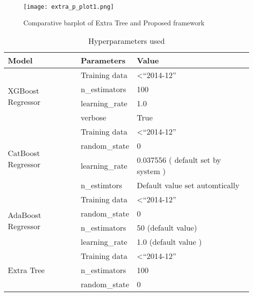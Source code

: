 \begin{figure*}[!h]
 \centering
 \texttt{[image: extra\_p\_plot1.png]}
 \label{}
 \caption{Comparative barplot of Extra Tree and Proposed framework }
\end{figure*}



\begin{table*}[]
\centering
\setlength{\tabcolsep}{3pt}
 {\renewcommand{\arraystretch}{1}%
\caption{Hyperparameters used}
\label{tab:my-table}
\begin{tabular}[c]{|p{}|p{}|p{}|}
\hline   \textbf{Model}                & \textbf{Parameters} & \textbf{Value}  \\ \hline 
\multirow{4}{*}{XGBoost   Regressor}  &  Training data       & \textless   “2014-12”                \\
                                      & n\_estimators       & 100                                  \\
                                      & learning\_rate      & 1.0                                  \\
                                      & verbose            & True                                \\  \hline 
\multirow{4}{*}{CatBoost   Regressor} & Training data       & \textless   “2014-12”                \\
                                      & random\_state       & 0                                    \\
                                      & learning\_rate      & 0.037556 ( default set   by system ) \\
                                      & n\_estimtors        & Default value   set automtically     \\ \hline
\multirow{4}{*}{AdaBoost   Regressor} & Training data       & \textless   “2014-12”                \\
                                      & random\_state       & 0                                    \\
                                      & n\_estimators       & 50    (default value)                \\
                                      & learning\_rate      & 1.0   (default value )               \\  \hline
\multirow{3}{*}{Extra Tree}           & Training data       & \textless   “2014-12”                \\
                                      & n\_estimators       & 100                                  \\
                                      & random\_state       & 0       \\ \hline
\end{tabular}%

}
\end{table*}

